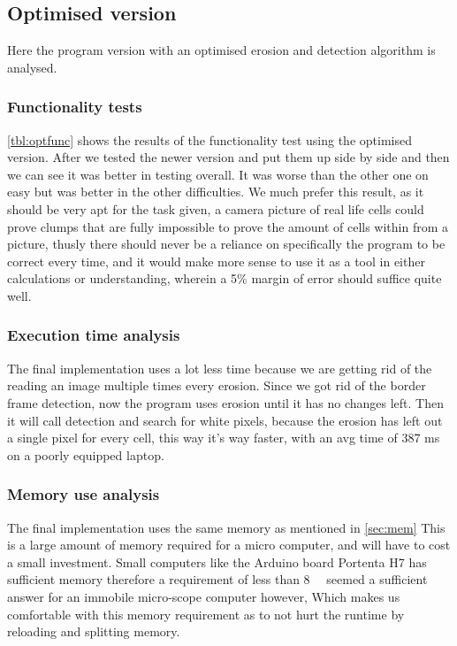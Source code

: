 \documentclass[a4paper, english]{article}
\numberwithin{equation}{section}
\begin{document}
\subsection{Optimised version}\label{sec:optimised}
Here the program version with an optimised erosion and detection algorithm is analysed.
\subsubsection{Functionality tests} \cref{tbl:optfunc} shows the results of the functionality test using the optimised version. After we tested the newer version and put them up side by side and then we can see it was better in testing overall. It was worse than the other one on easy but was better in the other difficulties. We much prefer this result, as it should be very apt for the task given, a camera picture of real life cells could prove clumps that are fully impossible to prove the amount of cells within from a picture, thusly there should never be a reliance on specifically the program to be correct every time, and it would make more sense to use it as a tool in either calculations or understanding, wherein a 5\% margin of error should suffice quite well.
\subsubsection{Execution time analysis}
The final implementation uses a lot less time because we are getting rid of the reading an image multiple times every erosion. Since we got rid of the border frame detection, now the program uses erosion until it has no changes left. Then it will call detection and search for white pixels, because the erosion has left out a single pixel for every cell, this way it's way faster, with an avg time of 387 ms on a poorly equipped laptop. 
\subsubsection{Memory use analysis}
The final implementation uses the same memory as mentioned in \cref{sec:mem}\newline
This is a large amount of memory required for a micro computer, and will have to cost a small investment. Small computers like the Arduino board Portenta H7\cite{arduino} has sufficient memory therefore a requirement of less than \SI{8}{\mega\byte} seemed a sufficient answer for an immobile micro-scope computer however, Which makes us comfortable with this memory requirement as to not hurt the runtime by reloading and splitting memory.
\end{document}
